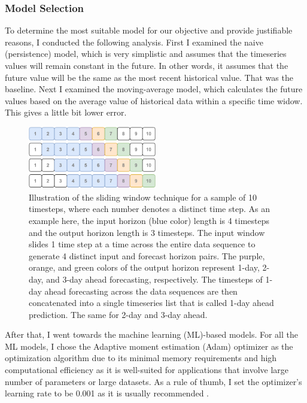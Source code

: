 \subsubsection{Model Selection}
To determine the most suitable model for our objective and provide justifiable reasons, I conducted the following analysis.
First I examined the naive (persistence) model, which is very simplistic and assumes that the timeseries values will remain constant in the future. In other words, it assumes that the future value will be the same as the most recent historical value. That was the baseline. Next I examined the moving-average model, which calculates the future values based on the average value of historical data within a specific time widow. This gives a little bit lower error.

\begin{figure}[htp]
	\centering
    \includegraphics[width=0.5\textwidth]{chapter4/figs/sliding_window_lstm.pdf}
    \caption{Illustration of the sliding window technique for a sample of 10 timesteps, where each number denotes a distinct time step. As an example here, the input horizon (blue color) length is 4 timesteps and the output horizon length is 3 timesteps. The input window slides 1 time step at a time across the entire data sequence to generate 4 distinct input and forecast horizon pairs. The purple, orange, and green colors of the output horizon represent 1-day, 2-day, and 3-day ahead forecasting, respectively. The timesteps of 1-day ahead forecasting across the data sequences are then concatenated into a single timeseries list that is called 1-day ahead prediction. The same for 2-day and 3-day ahead.}
\label{fig_slide_window}
\end{figure}

After that, I went towards the machine learning (ML)-based models. For all the ML models, I chose the Adaptive moment estimation (Adam) optimizer \citep{kingma_2015} as the optimization algorithm due to its minimal memory requirements and high computational efficiency as it is well-suited for applications that involve large number of parameters or large datasets. As a rule of thumb, I set the optimizer’s learning rate to be 0.001 as it is usually recommended \citep{zhang_2022}.

